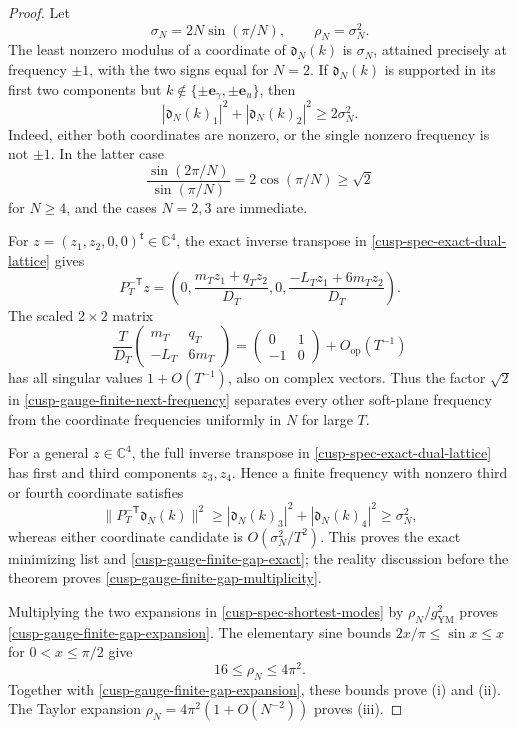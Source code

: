 \begin{proof}
Let
\[
 \sigma_N=2N\sin(\pi/N),\qquad \rho_N=\sigma_N^2.
\]
The least nonzero modulus of a coordinate of \(\mathfrak d_N(k)\) is \(\sigma_N\),
attained precisely at frequency \(\pm1\), with the two signs equal for
\(N=2\).  If \(\mathfrak d_N(k)\) is supported in its first two components but
\(k\notin\{\pm\mathbf e_\gamma,\pm\mathbf e_u\}\), then
\begin{equation}
 |\mathfrak d_N(k)_1|^2+|\mathfrak d_N(k)_2|^2\ge2\sigma_N^2.
 \label{cusp-gauge-finite-next-frequency}
\end{equation}
Indeed, either both coordinates are nonzero, or the single nonzero
frequency is not \(\pm1\).  In the latter case
\[
 \frac{\sin(2\pi/N)}{\sin(\pi/N)}
 =2\cos(\pi/N)\ge\sqrt2
\]
for \(N\ge4\), and the cases \(N=2,3\) are immediate.

For \(z=(z_1,z_2,0,0)^{\mathsf t}\in\mathbb C^4\), the exact inverse
transpose in \cref{cusp-spec-exact-dual-lattice} gives
\begin{equation}
 P_T^{-\mathsf T}z
 =\left(
 0,\frac{m_Tz_1+q_Tz_2}{D_T},
 0,\frac{-L_Tz_1+6m_Tz_2}{D_T}
 \right).
 \label{cusp-gauge-finite-soft-block}
\end{equation}
The scaled \(2\times2\) matrix
\[
 \frac{T}{D_T}
 \begin{pmatrix}m_T&q_T\\-L_T&6m_T\end{pmatrix}
 =
 \begin{pmatrix}0&1\\-1&0\end{pmatrix}
 +O_{\mathrm{op}}(T^{-1})
\]
has all singular values \(1+O(T^{-1})\), also on complex vectors.  Thus
the factor \(\sqrt2\) in
\cref{cusp-gauge-finite-next-frequency} separates every other soft-plane
frequency from the coordinate frequencies uniformly in \(N\) for large
\(T\).

For a general \(z\in\mathbb C^4\), the full inverse transpose in
\cref{cusp-spec-exact-dual-lattice} has first and third components
\(z_3,z_4\).  Hence a finite frequency with nonzero third or fourth
coordinate satisfies
\[
 \lVert P_T^{-\mathsf T}\mathfrak d_N(k)\rVert^2
 \ge |\mathfrak d_N(k)_3|^2+|\mathfrak d_N(k)_4|^2
 \ge\sigma_N^2,
\]
whereas either coordinate candidate is
\(O(\sigma_N^2/T^2)\).  This proves the exact minimizing list and
\cref{cusp-gauge-finite-gap-exact}; the reality discussion before the
theorem proves \cref{cusp-gauge-finite-gap-multiplicity}.

Multiplying the two expansions in
\cref{cusp-spec-shortest-modes} by
\(\rho_N/g_{\mathrm{YM}}^2\) proves
\cref{cusp-gauge-finite-gap-expansion}.  The elementary sine bounds
\(2x/\pi\le\sin x\le x\) for \(0<x\le\pi/2\) give
\begin{equation}
 16\le\rho_N\le4\pi^2.
 \label{cusp-gauge-finite-rho-bounds}
\end{equation}
Together with \cref{cusp-gauge-finite-gap-expansion}, these bounds prove
(i) and (ii).  The Taylor expansion
\(\rho_N=4\pi^2(1+O(N^{-2}))\) proves (iii).


\end{proof}
